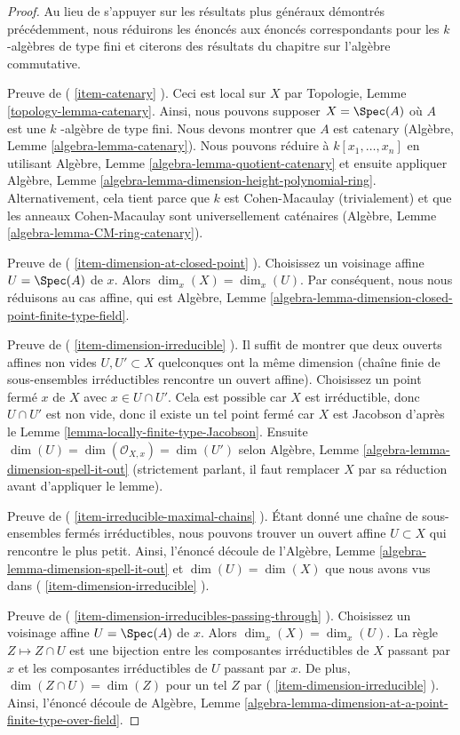 \begin{proof}
Au lieu de s'appuyer sur les résultats plus généraux
démontrés précédemment, nous réduirons les énoncés aux
énoncés correspondants pour les $k$ -algèbres de type fini et
citerons des résultats du chapitre sur l'algèbre commutative.

\medskip\noindent
Preuve de ( \ref{item-catenary} ). Ceci est local sur $X$ par
Topologie, Lemme \ref{topology-lemma-catenary}. Ainsi, nous
pouvons supposer $X = \Spec(A)$ où $A$ est une $k$ -algèbre de
type fini. Nous devons montrer que $A$ est catenary (Algèbre,
Lemme \ref{algebra-lemma-catenary}). Nous pouvons réduire à
$k[x_1, \ldots, x_n]$ en utilisant Algèbre, Lemme
\ref{algebra-lemma-quotient-catenary} et ensuite appliquer
Algèbre, Lemme
\ref{algebra-lemma-dimension-height-polynomial-ring}. Alternativement, cela tient
parce que $k$ est Cohen-Macaulay (trivialement) et que les anneaux Cohen-Macaulay
sont universellement caténaires (Algèbre, Lemme \ref{algebra-lemma-CM-ring-catenary}).

\medskip\noindent
Preuve de ( \ref{item-dimension-at-closed-point} ). Choisissez un
voisinage affine $U = \Spec(A)$ de $x$. Alors $\dim_x(X) =
\dim_x(U)$. Par conséquent, nous nous réduisons au cas affine, qui est
Algèbre, Lemme \ref{algebra-lemma-dimension-closed-point-finite-type-field}.

\medskip\noindent
Preuve de ( \ref{item-dimension-irreducible} ). Il suffit de
montrer que deux ouverts affines non vides $U, U' \subset X$
quelconques ont la même dimension (chaîne finie de
sous-ensembles irréductibles rencontre un ouvert affine).
Choisissez un point fermé $x$ de $X$ avec $x \in U \cap U'$. Cela
est possible car $X$ est irréductible, donc $U \cap U'$ est non
vide, donc il existe un tel point fermé car $X$ est Jacobson
d'après le Lemme \ref{lemma-locally-finite-type-Jacobson}. Ensuite
$\dim(U) = \dim(\mathcal{O}_{X, x}) = \dim(U')$ selon Algèbre,
Lemme \ref{algebra-lemma-dimension-spell-it-out} (strictement
parlant, il faut remplacer $X$ par sa réduction avant d'appliquer le lemme).

\medskip\noindent
Preuve de ( \ref{item-irreducible-maximal-chains} ). Étant
donné une chaîne de sous-ensembles fermés irréductibles, nous
pouvons trouver un ouvert affine $U \subset X$ qui rencontre
le plus petit. Ainsi, l'énoncé découle de l'Algèbre, Lemme
\ref{algebra-lemma-dimension-spell-it-out} et $\dim(U) =
\dim(X)$ que nous avons vus dans ( \ref{item-dimension-irreducible} ).

\medskip\noindent
Preuve de (
\ref{item-dimension-irreducibles-passing-through} ).
Choisissez un voisinage affine $U = \Spec(A)$ de $x$. Alors
$\dim_x(X) = \dim_x(U)$. La règle $Z \mapsto Z \cap U$ est une
bijection entre les composantes irréductibles de $X$ passant par
$x$ et les composantes irréductibles de $U$ passant par $x$. De
plus, $\dim(Z \cap U) = \dim(Z)$ pour un tel $Z$ par (
\ref{item-dimension-irreducible} ). Ainsi, l'énoncé découle de Algèbre,
Lemme \ref{algebra-lemma-dimension-at-a-point-finite-type-over-field}.


\end{proof}
